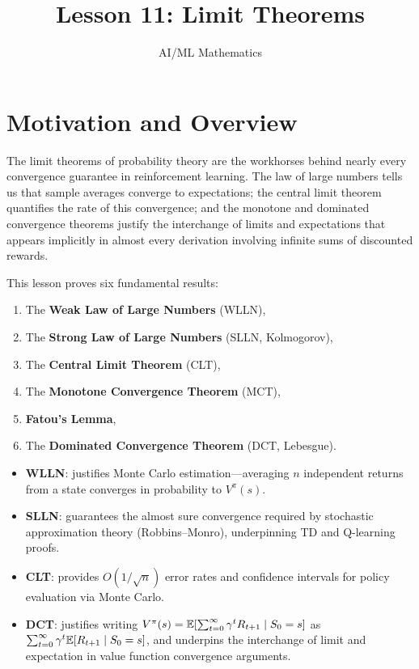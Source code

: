 \documentclass[11pt,a4paper]{article}
\title{Lesson 11: Limit Theorems}
\author{AI/ML Mathematics}
\date{}
\begin{document}
\maketitle
\tableofcontents
\newpage


\section{Motivation and Overview}
\label{sec:motivation}

The limit theorems of probability theory are the workhorses behind
nearly every convergence guarantee in reinforcement learning.  The
law of large numbers tells us that sample averages converge to
expectations; the central limit theorem quantifies the rate of this
convergence; and the monotone and dominated convergence theorems
justify the interchange of limits and expectations that appears
implicitly in almost every derivation involving infinite sums of
discounted rewards.

This lesson proves six fundamental results:
\begin{enumerate}[nosep]
  \item The \textbf{Weak Law of Large Numbers} (WLLN),
  \item The \textbf{Strong Law of Large Numbers} (SLLN, Kolmogorov),
  \item The \textbf{Central Limit Theorem} (CLT),
  \item The \textbf{Monotone Convergence Theorem} (MCT),
  \item \textbf{Fatou's Lemma},
  \item The \textbf{Dominated Convergence Theorem} (DCT, Lebesgue).
\end{enumerate}

\begin{rlconnection}[title={Why This Matters for RL}]
\begin{itemize}[nosep]
  \item \textbf{WLLN}: justifies Monte Carlo estimation---averaging
    $n$ independent returns from a state converges in probability
    to $V^\pi(s)$.
  \item \textbf{SLLN}: guarantees the almost sure convergence
    required by stochastic approximation theory (Robbins--Monro),
    underpinning TD and Q-learning proofs.
  \item \textbf{CLT}: provides $O(1/\sqrt{n})$ error rates and
    confidence intervals for policy evaluation via Monte Carlo.
  \item \textbf{DCT}: justifies writing
    $V^\pi(s) = \mathbb{E}[\sum_{t=0}^\infty \gamma^t R_{t+1} \mid S_0=s]$
    as $\sum_{t=0}^\infty \gamma^t \mathbb{E}[R_{t+1} \mid S_0=s]$, and
    underpins the interchange of limit and expectation in value
    function convergence arguments.
\end{itemize}
\end{rlconnection}
\end{document}
